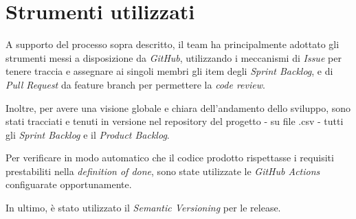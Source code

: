\section{Strumenti utilizzati}\label{sec:strumenti-utilizzati}
A supporto del processo sopra descritto, il team ha principalmente adottato gli strumenti messi a disposizione da \textit{GitHub}, utilizzando i meccanismi di \textit{Issue} per
tenere traccia e assegnare ai singoli membri gli item degli \textit{Sprint Backlog}, e di \textit{Pull Request} da feature branch per permettere la \textit{code review}.

Inoltre, per avere una visione globale e chiara dell'andamento dello sviluppo, sono stati tracciati e tenuti in versione nel repository del progetto - su file .csv - tutti gli \textit{Sprint Backlog} e il \textit{Product Backlog}.

Per verificare in modo automatico che il codice prodotto rispettasse i requisiti prestabiliti nella \textit{definition of done}, sono state utilizzate le \textit{GitHub Actions} configuarate opportunamente.

In ultimo, è stato utilizzato il \textit{Semantic Versioning}  per le release.
